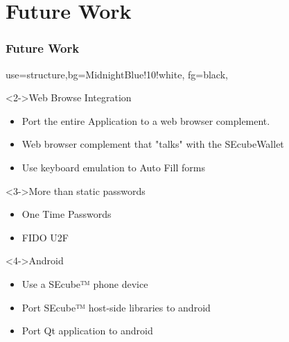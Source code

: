 \documentclass[14pt,usenames,dvipsnames]{beamer}
\begin{document}
\section{Future Work}
\begin{frame}
	\frametitle{Future Work}
	{
	 {use=structure,bg=MidnightBlue!10!white, fg=black,}
  \fontsize{14pt}{14}\selectfont

	
  \vspace{-0.3cm}	
	  
	\begin{block}<2->{Web Browse Integration}
		\begin{itemize}
		  \item Port the entire Application to a web browser complement.
			\item Web browser complement that "talks" with the SEcubeWallet
			\item Use keyboard emulation to Auto Fill forms
		\end{itemize}
	\end{block}

	\vspace{-0.1cm}	

	\begin{block}<3->{More than static passwords}
		\begin{itemize}
			\item One Time Passwords
			\item FIDO U2F
		\end{itemize}
	\end{block}
	
	\vspace{-0.1cm}	
	
	\begin{block}<4->{Android}
		\begin{itemize}
			\item Use a SEcube™ phone device
			\item Port SEcube™ host-side libraries to android
			\item Port Qt application to android
		\end{itemize}
	\end{block}	
	}
	
\end{frame}

\end{document}
